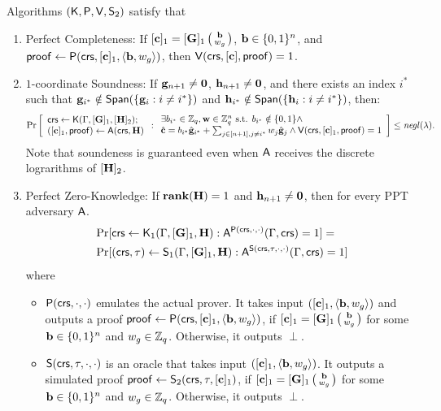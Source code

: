 \begin{theorem} Algorithms $(\mathsf{K},\mathsf{P},\mathsf{V},\mathsf{S}_2)$ satisfy that
\begin{enumerate}[label=\alph*)]
 \item Perfect Completeness: If $[\mathbf{c}]_1 = [\mathbf{{G}}]_1\left(\begin{smallmatrix}\mathbf{b}\\w_g\end{smallmatrix}\right)$, $\mathbf{b}\in\{0,1\}^n$, and $\mathsf{proof}\gets\mathsf{P}(\mathsf{crs},[\mathbf{c}]_1,\langle\mathbf{b},w_g\rangle)$, then $\mathsf{V}(\mathsf{crs},[\mathbf{c}],\mathsf{proof})=1$.
\item $1$-coordinate Soundness: If $\mathbf{g}_{n+1}\neq\mathbf{0}$, $\mathbf{h}_{n+1}\neq\mathbf{0}$, and there exists an index $i^*$ such that $\mathbf{g}_{i^*} \notin \mathsf{Span}(\{\mathbf{g}_{i} : i \neq i^*\})$ and $\mathbf{h}_{i^*} \notin \mathsf{Span}(\{\mathbf{h}_{i} : i \neq i^*\})$, then:
\begin{multline*}
\Pr\left[
    \begin{array}{l}
        \crs\gets\algK(\Gamma,[\matr{G}]_1,[\matr{H}]_2);\\
        ([\vecb{c}]_1,\mathsf{proof}) \gets \advA(\mathsf{crs},\matr{H})
    \end{array}:
    \begin{array}{l}
    \exists b_{i^*}\in\Z_q, \vecb{w}\in\Z_q^n\text{ s.t. } b_{i^*} \notin \{0,1\} \wedge\\
        \hvecb{c}= b_{i^*} \hvecb{g}_{i^*} + \sum_{j \in [n+1], j\neq i^*} w_{j} \hvecb{g}_{j}  \wedge
        \algV(\mathsf{crs},[\vecb{c}]_1,\mathsf{proof})=1 
    \end{array}\right]\leq\negl(\lambda).$$
\end{multline*}
Note that soundeness is guaranteed even when $\mathsf{A}$ receives the discrete lograrithms of $[\mathbf{{H}}]_2$.
\item Perfect Zero-Knowledge: If $\mathbf{rank}(\mathbf{{H}})=1$ and $\mathbf{h}_{n+1}\neq\mathbf{0}$, then for every PPT adversary $\mathsf{A}$.
\begin{align*}
&\Pr[
    \mathsf{crs} \gets \mathsf{K}_1(\Gamma,[\mathbf{{G}}]_1,\mathbf{{H}}):
        \mathsf{A}^{\mathsf{P}(\mathsf{crs},\cdot, \cdot)}(\Gamma,\mathsf{crs}) = 1]
=\\
&\Pr[
    (\mathsf{crs},\tau) \gets \mathsf{S}_1(\Gamma, [\mathbf{{G}}]_1,\mathbf{{H}}):
        \mathsf{A}^{\mathsf{S}(\mathsf{crs},\tau,\cdot,\cdot)}(\Gamma,\mathsf{crs})=1]
\end{align*}
where
\begin{itemize}
\item $\mathsf{P}(\mathsf{crs}, \cdot, \cdot)$ emulates the actual prover. It takes input $([\mathbf{c}]_1,\langle\mathbf{b},w_g\rangle)$ and outputs a 
proof $\mathsf{proof}\gets\mathsf{P}(\mathsf{crs},[\mathbf{c}]_1,\langle\mathbf{b},w_g\rangle)$, if $[\mathbf{c}]_1=[\mathbf{{G}}]_1\left(\begin{smallmatrix}\mathbf{b}\\w_g\end{smallmatrix}\right)$ for some $\mathbf{b}\in\{0,1\}^n$ and $w_g\in\mathbb{Z}_q$. Otherwise, it outputs $\perp$.
\item $\mathsf{S}(\mathsf{crs},\tau, \cdot, \cdot)$ is an oracle that takes input $([\mathbf{c}]_1,\langle\mathbf{b},w_g\rangle)$. It outputs a simulated proof
$\mathsf{proof}\gets\mathsf{S}_2(\mathsf{crs},\tau, [\mathbf{c}]_1)$, if $[\mathbf{c}]_1=[\mathbf{{G}}]_1\left(\begin{smallmatrix}\mathbf{b}\\w_g\end{smallmatrix}\right)$ for some $\mathbf{b}\in\{0,1\}^n$ and $w_g\in\mathbb{Z}_q$. Otherwise, it outputs $\perp$.
\end{itemize}


\end{enumerate}
\end{theorem}
